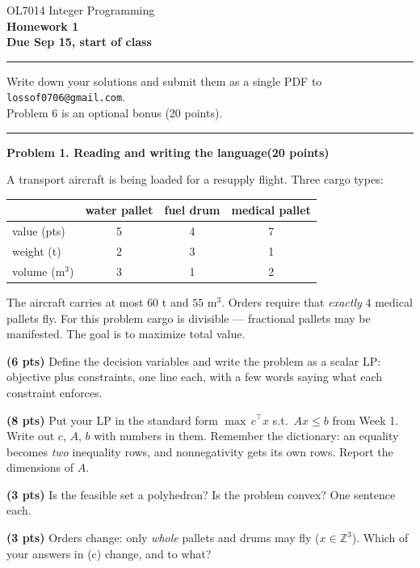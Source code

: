 \documentclass[10pt]{article}
\newcommand{\problem}[2]{%
  \par\bigskip
  {\color{ruleink}\rule{\textwidth}{1pt}}\par\nobreak\vspace{3pt}
  {\large\bfseries #2}\hfill{\normalsize\bfseries(#1 points)}\par\nobreak\vspace{4pt}}
\begin{document}
\begin{center}
  {\large OL7014 Integer Programming}\\[3pt]
  {\Large\bfseries Homework 1}\\[4pt]
  {\small \textbf{Due Sep 15, start of class}}
\end{center}
\medskip\hrule\medskip

Write down your solutions and submit them as a single PDF to
\texttt{lossof0706@gmail.com}.\\
Problem 6 is an optional bonus (20 points).

\problem{20}{Problem 1. Reading and writing the language}

A transport aircraft is being loaded for a resupply flight. Three cargo types:

\begin{center}
\begin{tabular}{l|ccc}
              & water pallet & fuel drum & medical pallet \\ \hline
 value (pts)  & 5 & 4 & 7 \\
 weight (t)   & 2 & 3 & 1 \\
 volume (m$^3$) & 3 & 1 & 2 \\
\end{tabular}
\end{center}

The aircraft carries at most $60$ t and $55$ m$^3$. Orders require that \emph{exactly}
$4$ medical pallets fly. For this problem cargo is divisible --- fractional pallets may
be manifested. The goal is to maximize total value.

\begin{parts}
\item \textbf{(6 pts)} Define the decision variables and write the problem as a scalar
  LP: objective plus constraints, one line each, with a few words saying what each
  constraint enforces.
\item \textbf{(8 pts)} Put your LP in the standard form
  $\max\, c^{\top}x$ s.t.\ $Ax \le b$ from Week 1. Write out $c$, $A$, $b$ with
  numbers in them. Remember the dictionary: an equality becomes \emph{two} inequality
  rows, and nonnegativity gets its own rows. Report the dimensions of $A$.
\item \textbf{(3 pts)} Is the feasible set a polyhedron? Is the problem convex?
  One sentence each.
\item \textbf{(3 pts)} Orders change: only \emph{whole} pallets and drums may fly
  ($x \in \mathbb{Z}^3$). Which of your answers in (c) change, and to what?
\end{parts}
\end{document}
